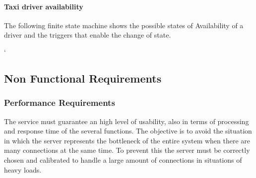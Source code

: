 \documentclass[a4paper,11pt]{report} %
\begin{document}
		\paragraph{Taxi driver availability} The following finite state machine shows the possible states of Availability of a driver and the triggers that enable the change of state.\\
		\vspace*{1.1cm}
		
		\noindent%
		\begin{minipage}{\linewidth}
		\end{minipage}	`	
	
	\pagebreak
		
	\subsection{Non Functional Requirements}
	
	\subsubsection{Performance Requirements} The service must guarantee an high level of usability, also in terms of processing and response time of the several functions. The objective is to avoid the situation in which the server represents the bottleneck of the entire system when there are many connections at the same time. To prevent this the server must be correctly chosen and calibrated to handle a large amount of connections in situations of heavy loads. 
	
%		
%	
%	
\end{document}
